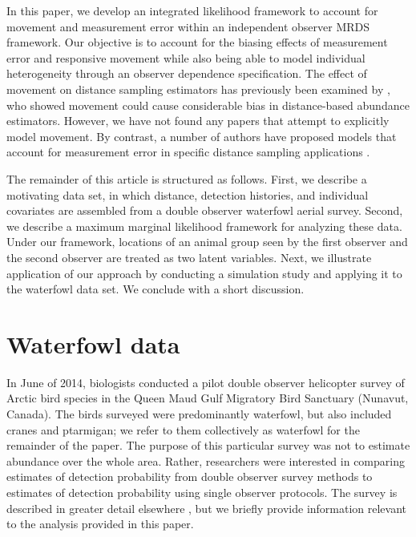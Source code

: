 \documentclass[12pt,fleqn]{article}
\begin{document}
In this paper, we develop an integrated likelihood framework to account for movement and measurement error within an independent observer MRDS framework.  Our objective is to account for the biasing effects of measurement error and responsive movement while also being able to model individual heterogeneity through an observer dependence specification.  The effect of movement on distance sampling estimators has previously been examined by \citet{GlennieEtAl2015}, who showed movement could cause considerable bias in distance-based abundance estimators.  However, we have not found any papers that attempt to explicitly model movement.  By contrast, a number of authors have proposed models that account for measurement error in specific distance sampling applications \citep[see e.g.][and references therein]{BorchersEtAl2010}.

The remainder of this article is structured as follows.  First, we describe a motivating data set, in which distance, detection histories, and individual covariates are assembled from a double observer waterfowl aerial survey.  Second, we describe a maximum marginal likelihood framework for analyzing these data.  Under our framework, locations of an animal group seen by the first observer and the second observer are treated as two latent variables.  Next, we illustrate application of our approach by conducting a simulation study and applying it to the waterfowl data set.  We conclude with a short discussion.


\section{Waterfowl data}

In June of 2014, biologists conducted a pilot double observer helicopter survey of Arctic bird species in the Queen Maud Gulf Migratory Bird Sanctuary (Nunavut, Canada). The birds surveyed were predominantly waterfowl, but also included cranes and ptarmigan; we refer to them collectively as waterfowl for the remainder of the paper. The purpose of this particular survey was not to estimate abundance over the whole area. Rather, researchers were interested in comparing estimates of detection probability from double observer survey methods to estimates of detection probability using single observer protocols.
The survey is described in greater detail elsewhere \citep{AlisauskasConn2017}, but we briefly provide information relevant to the analysis provided in this paper.
\end{document}
